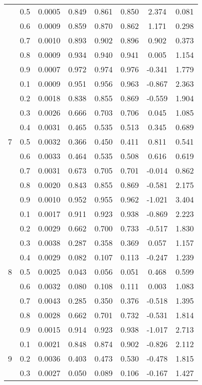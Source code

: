 \documentclass[11pt,a4paper]{report}
\begin{document}
\begin{longtable}{ | c | c || c | c | c | c | c | c | }
 & 0.5 & 0.0005 & 0.849 & 0.861 & 0.850 & 2.374 & 0.081 \\
 & 0.6 & 0.0009 & 0.859 & 0.870 & 0.862 & 1.171 & 0.298 \\
 & 0.7 & 0.0010 & 0.893 & 0.902 & 0.896 & 0.902 & 0.373 \\
 & 0.8 & 0.0009 & 0.934 & 0.940 & 0.941 & 0.005 & 1.154 \\
 & 0.9 & 0.0007 & 0.972 & 0.974 & 0.976 & -0.341 & 1.779 \\
 \hline
\multirow{9}{*}{7} & 0.1 & 0.0009 & 0.951 & 0.956 & 0.963 & -0.867 & 2.363 \\
 & 0.2 & 0.0018 & 0.838 & 0.855 & 0.869 & -0.559 & 1.904 \\
 & 0.3 & 0.0026 & 0.666 & 0.703 & 0.706 & 0.045 & 1.085 \\
 & 0.4 & 0.0031 & 0.465 & 0.535 & 0.513 & 0.345 & 0.689 \\
 & 0.5 & 0.0032 & 0.366 & 0.450 & 0.411 & 0.811 & 0.541 \\
 & 0.6 & 0.0033 & 0.464 & 0.535 & 0.508 & 0.616 & 0.619 \\
 & 0.7 & 0.0031 & 0.673 & 0.705 & 0.701 & -0.014 & 0.862 \\
 & 0.8 & 0.0020 & 0.843 & 0.855 & 0.869 & -0.581 & 2.175 \\
 & 0.9 & 0.0010 & 0.952 & 0.955 & 0.962 & -1.021 & 3.404 \\
 \hline
\multirow{9}{*}{8} & 0.1 & 0.0017 & 0.911 & 0.923 & 0.938 & -0.869 & 2.223 \\
 & 0.2 & 0.0029 & 0.662 & 0.700 & 0.733 & -0.517 & 1.830 \\
 & 0.3 & 0.0038 & 0.287 & 0.358 & 0.369 & 0.057 & 1.157 \\
 & 0.4 & 0.0029 & 0.082 & 0.107 & 0.113 & -0.247 & 1.239 \\
 & 0.5 & 0.0025 & 0.043 & 0.056 & 0.051 & 0.468 & 0.599 \\
 & 0.6 & 0.0032 & 0.080 & 0.108 & 0.111 & 0.003 & 1.083 \\
 & 0.7 & 0.0043 & 0.285 & 0.350 & 0.376 & -0.518 & 1.395 \\
 & 0.8 & 0.0028 & 0.662 & 0.701 & 0.732 & -0.531 & 1.814 \\
 & 0.9 & 0.0015 & 0.914 & 0.923 & 0.938 & -1.017 & 2.713 \\
 \hline
\multirow{9}{*}{9} & 0.1 & 0.0021 & 0.848 & 0.874 & 0.902 & -0.826 & 2.112 \\
 & 0.2 & 0.0036 & 0.403 & 0.473 & 0.530 & -0.478 & 1.815 \\
 & 0.3 & 0.0027 & 0.050 & 0.089 & 0.106 & -0.167 & 1.427 \\

\end{longtable}
\end{document}

